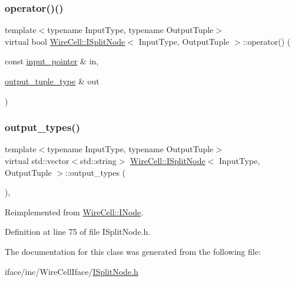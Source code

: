 \subsubsection{\texorpdfstring{operator()()}{operator()()}\hspace{0.1cm}{\footnotesize\ttfamily [2/2]}}
{\footnotesize\ttfamily template$<$typename Input\+Type, typename Output\+Tuple$>$ \\
virtual bool \hyperlink{class_wire_cell_1_1_i_split_node}{Wire\+Cell\+::\+I\+Split\+Node}$<$ Input\+Type, Output\+Tuple $>$\+::operator() (\begin{DoxyParamCaption}\item[{const \hyperlink{class_wire_cell_1_1_i_split_node_a270990964b36cf939159efa595779407}{input\+\_\+pointer} \&}]{in,  }\item[{\hyperlink{class_wire_cell_1_1_i_split_node_acd382a6b5a9c3f322943ce2dd66fa7f4}{output\+\_\+tuple\+\_\+type} \&}]{out }\end{DoxyParamCaption})\hspace{0.3cm}{\ttfamily [pure virtual]}}

\mbox{\label{class_wire_cell_1_1_i_split_node_a924ce0894e2f6dec8fb49b14923df91d}} 
\subsubsection{\texorpdfstring{output\+\_\+types()}{output\_types()}}
{\footnotesize\ttfamily template$<$typename Input\+Type, typename Output\+Tuple$>$ \\
virtual std\+::vector$<$std\+::string$>$ \hyperlink{class_wire_cell_1_1_i_split_node}{Wire\+Cell\+::\+I\+Split\+Node}$<$ Input\+Type, Output\+Tuple $>$\+::output\+\_\+types (\begin{DoxyParamCaption}{ }\end{DoxyParamCaption})\hspace{0.3cm}{\ttfamily [inline]}, {\ttfamily [virtual]}}



Reimplemented from \hyperlink{class_wire_cell_1_1_i_node_aba7e537684cb4f2453796ff73da2d602}{Wire\+Cell\+::\+I\+Node}.



Definition at line 75 of file I\+Split\+Node.\+h.



The documentation for this class was generated from the following file\+:\begin{DoxyCompactItemize}
\item 
iface/inc/\+Wire\+Cell\+Iface/\hyperlink{_i_split_node_8h}{I\+Split\+Node.\+h}\end{DoxyCompactItemize}
